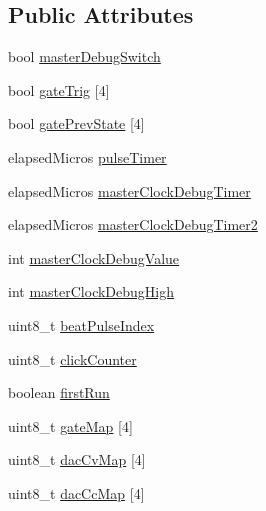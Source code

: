 \subsection*{Public Attributes}
\begin{DoxyCompactItemize}
\item 
bool \hyperlink{class_master_clock_a5c77eeb804310bc0058796eeaec02bbc}{master\+Debug\+Switch}
\item 
bool \hyperlink{class_master_clock_afc3d54b72c3a90063691f5e171710314}{gate\+Trig} \mbox{[}4\mbox{]}
\item 
bool \hyperlink{class_master_clock_ae919e5bfda6905d221b2f149fd033c2d}{gate\+Prev\+State} \mbox{[}4\mbox{]}
\item 
elapsed\+Micros \hyperlink{class_master_clock_ad68af6405839bca474e1044548d08f48}{pulse\+Timer}
\item 
elapsed\+Micros \hyperlink{class_master_clock_aa512b11ce67b901db7c784ef06adab5a}{master\+Clock\+Debug\+Timer}
\item 
elapsed\+Micros \hyperlink{class_master_clock_a797809c2f6478b735a50e75f7704b46b}{master\+Clock\+Debug\+Timer2}
\item 
int \hyperlink{class_master_clock_ae3cc05875b81ac9e713fc5c7e1eb4424}{master\+Clock\+Debug\+Value}
\item 
int \hyperlink{class_master_clock_a79fc4a121043c27d50e624138eaa442a}{master\+Clock\+Debug\+High}
\item 
uint8\+\_\+t \hyperlink{class_master_clock_a0ad4b4c84d2c4edb8922b4ee35a82463}{beat\+Pulse\+Index}
\item 
uint8\+\_\+t \hyperlink{class_master_clock_a38515df1824a4cadd6d8a277b5792dc3}{click\+Counter}
\item 
boolean \hyperlink{class_master_clock_a6cf4f883b5bfe440ec16c62728d87700}{first\+Run}
\item 
uint8\+\_\+t \hyperlink{class_master_clock_a21dc33657b252a53f66a2550c544451d}{gate\+Map} \mbox{[}4\mbox{]}
\item 
uint8\+\_\+t \hyperlink{class_master_clock_a35960fd751776d935310d4d580b3647d}{dac\+Cv\+Map} \mbox{[}4\mbox{]}
\item 
uint8\+\_\+t \hyperlink{class_master_clock_a8b3d56a964ecdfc61f7368184713dea0}{dac\+Cc\+Map} \mbox{[}4\mbox{]}
\end{DoxyCompactItemize}
